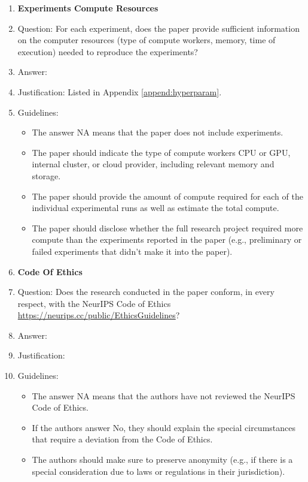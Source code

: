 \documentclass{article}
\theoremstyle{plain}
\theoremstyle{definition}
\theoremstyle{remark}
\begin{document}
\begin{enumerate}
\item {\bf Experiments Compute Resources}
    \item[] Question: For each experiment, does the paper provide sufficient information on the computer resources (type of compute workers, memory, time of execution) needed to reproduce the experiments?
    \item[] Answer: \answerYes{} %
    \item[] Justification: Listed in Appendix \ref{append:hyperparam}.
    \item[] Guidelines:
    \begin{itemize}
        \item The answer NA means that the paper does not include experiments.
        \item The paper should indicate the type of compute workers CPU or GPU, internal cluster, or cloud provider, including relevant memory and storage.
        \item The paper should provide the amount of compute required for each of the individual experimental runs as well as estimate the total compute. 
        \item The paper should disclose whether the full research project required more compute than the experiments reported in the paper (e.g., preliminary or failed experiments that didn't make it into the paper). 
    \end{itemize}
    
\item {\bf Code Of Ethics}
    \item[] Question: Does the research conducted in the paper conform, in every respect, with the NeurIPS Code of Ethics \url{https://neurips.cc/public/EthicsGuidelines}?
    \item[] Answer: \answerYes{} %
    \item[] Justification: 
    \item[] Guidelines:
    \begin{itemize}
        \item The answer NA means that the authors have not reviewed the NeurIPS Code of Ethics.
        \item If the authors answer No, they should explain the special circumstances that require a deviation from the Code of Ethics.
        \item The authors should make sure to preserve anonymity (e.g., if there is a special consideration due to laws or regulations in their jurisdiction).
    \end{itemize}



\end{enumerate}
\end{document}

